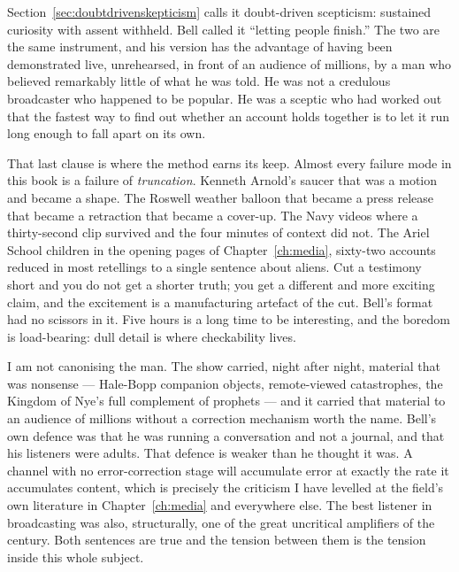  Section~\ref{sec:doubtdrivenskepticism}
calls it doubt-driven scepticism: sustained curiosity with assent withheld. Bell
called it ``letting people finish.'' The two are the same instrument, and his version
has the advantage of having been demonstrated live, unrehearsed, in front of an
audience of millions, by a man who believed remarkably little of what he was told.
He was not a credulous broadcaster who happened to be popular. He was a sceptic
who had worked out that the fastest way to find out whether an account holds
together is to let it run long enough to fall apart on its own.


That last clause is where the method earns its keep. Almost every failure mode in
this book is a failure of \emph{truncation}. Kenneth Arnold's saucer that was a
motion and became a shape. The Roswell weather balloon that became a press release
that became a retraction that became a cover-up. The Navy videos where a
thirty-second clip survived and the four minutes of context did not. The Ariel
School children in the opening pages of Chapter~\ref{ch:media}, sixty-two accounts reduced in most
retellings to a single sentence about aliens. Cut a testimony short and you do not
get a shorter truth; you get a different and more exciting claim, and the excitement
is a manufacturing artefact of the cut. Bell's format had no scissors in it. Five
hours is a long time to be interesting, and the boredom is load-bearing: dull detail
is where checkability lives.

I am not canonising the man. The show carried, night after night, material that was
nonsense --- Hale-Bopp companion objects, remote-viewed catastrophes, the Kingdom of
Nye's full complement of prophets --- and it carried that material to an audience of
millions without a correction mechanism worth the name. Bell's own defence was that
he was running a conversation and not a journal, and that his listeners were adults.
That defence is weaker than he thought it was. A channel with no error-correction
stage will accumulate error at exactly the rate it accumulates content, which is
precisely the criticism I have levelled at the field's own literature in
Chapter~\ref{ch:media} and everywhere else. The best listener in broadcasting was
also, structurally, one of the great uncritical amplifiers of the century. Both
sentences are true and the tension between them is the tension inside this whole
subject.

